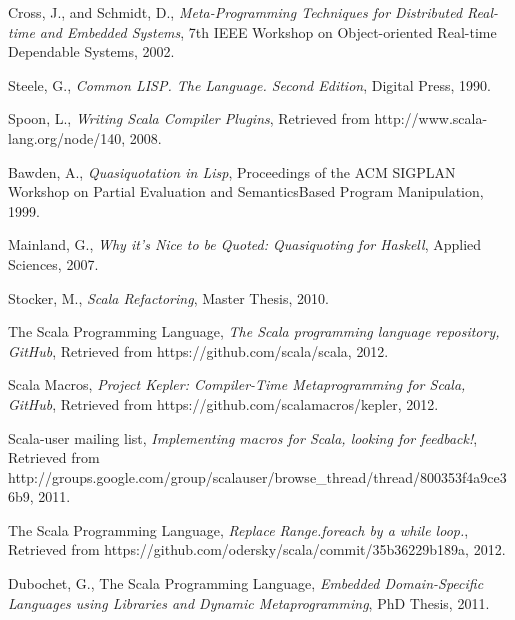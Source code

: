 \documentclass{llncs}
\begin{document}
\begin{thebibliography}{99}
  Cross, J., and Schmidt, D.,
  \emph{Meta-Programming Techniques for Distributed Real-time and Embedded Systems},
  7th IEEE Workshop on Object-oriented Real-time Dependable Systems,
  2002.

  Steele, G.,
  \emph{Common LISP. The Language. Second Edition},
  Digital Press,
  1990.

  Spoon, L.,
  \emph{Writing Scala Compiler Plugins},
  Retrieved from http://www.scala-lang.org/node/140,
  2008.

  Bawden, A.,
  \emph{Quasiquotation in Lisp},
  Proceedings of the ACM SIGPLAN Workshop on Partial Evaluation and SemanticsBased Program Manipulation,
  1999.

  Mainland, G.,
  \emph{Why it's Nice to be Quoted: Quasiquoting for Haskell},
  Applied Sciences,
  2007.

  Stocker, M.,
  \emph{Scala Refactoring},
  Master Thesis,
  2010.

  The Scala Programming Language,
  \emph{The Scala programming language repository, GitHub},
  Retrieved from https://github.com/scala/scala,
  2012.

  Scala Macros,
  \emph{Project Kepler: Compiler-Time Metaprogramming for Scala, GitHub},
  Retrieved from https://github.com/scalamacros/kepler,
  2012.

  Scala-user mailing list,
  \emph{Implementing macros for Scala, looking for feedback!},
  Retrieved from http://groups.google.com/group/scala\-user/browse\_thread/thread/800353f4a9ce36b9,
  2011.

  The Scala Programming Language,
  \emph{Replace Range.foreach by a while loop.},
  Retrieved from https://github.com/odersky/scala/commit/35b36229b189a,
  2012.

  Dubochet, G.,
  The Scala Programming Language,
  \emph{Embedded Domain-Specific Languages using Libraries and Dynamic Metaprogramming},
  PhD Thesis,
  2011.

\end{thebibliography}
\end{document}
